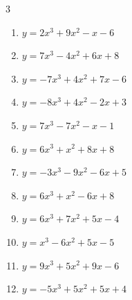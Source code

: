 \begin{multicols}{3}
\begin{enumerate}

  \item $y=2x^{3}+9x^{2}-x-6$


  \item $y=7x^{3}-4x^{2}+6x+8$


  \item $y=-7x^{3}+4x^{2}+7x-6$


  \item $y=-8x^{3}+4x^{2}-2x+3$


  \item $y=7x^{3}-7x^{2}-x-1$


  \item $y=6x^{3}+x^{2}+8x+8$


  \item $y=-3x^{3}-9x^{2}-6x+5$


  \item $y=6x^{3}+x^{2}-6x+8$


  \item $y=6x^{3}+7x^{2}+5x-4$


  \item $y=x^{3}-6x^{2}+5x-5$


  \item $y=9x^{3}+5x^{2}+9x-6$


  \item $y=-5x^{3}+5x^{2}+5x+4$



\end{enumerate}
\end{multicols}

